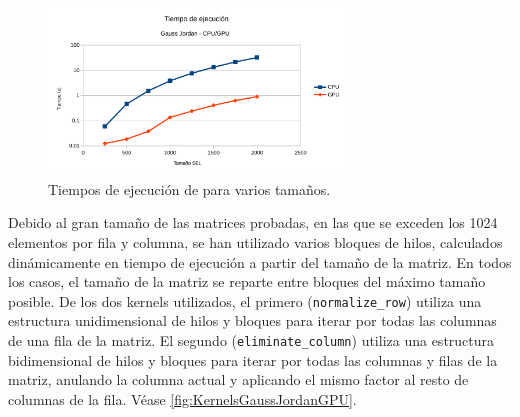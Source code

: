 \begin{figure}[h]
    \centering
    \includegraphics[width=0.7\textwidth]{img/EQ_GPU_TIME.pdf}
    \caption{Tiempos de ejecución de para varios tamaños.}
    \label{fig:gpu_time}
\end{figure}

Debido al gran tamaño de las matrices probadas,
en las que se exceden los 1024 elementos por fila y columna,
se han utilizado varios bloques de hilos,
calculados dinámicamente en tiempo de ejecución
a partir del tamaño de la matriz.
En todos los casos, el tamaño de la matriz se reparte entre bloques
del máximo tamaño posible.
De los dos kernels utilizados, 
el primero (\texttt{normalize\_row})
utiliza una estructura unidimensional de hilos y bloques
para iterar por todas las columnas de una fila
de la matriz.
El segundo (\texttt{eliminate\_column})
utiliza una estructura bidimensional de hilos y bloques
para iterar por todas las columnas y filas de la matriz,
anulando la columna actual y aplicando el mismo
factor al resto de columnas de la fila.
Véase \ref{fig:KernelsGaussJordanGPU}.


